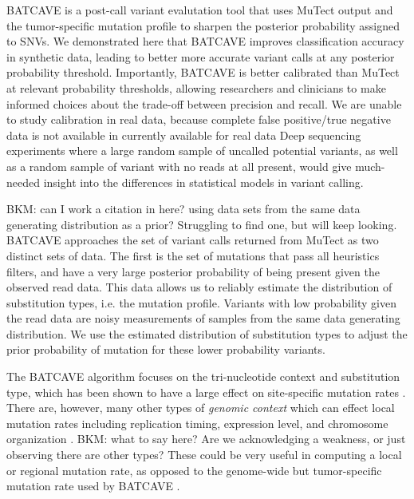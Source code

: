 \documentclass[a4,center,fleqn]{NAR}
\newcommand{\bkmcomment}[1]{{\color{blue}BKM: #1}}
\newcommand{\batcave}{BATCAVE }
\begin{document}
\batcave is a post-call variant evalutation tool that uses MuTect output and the tumor-specific mutation profile to sharpen the posterior probability assigned to SNVs.
We demonstrated here that \batcave improves classification accuracy in synthetic data, leading to better more accurate variant calls at any posterior probability threshold.
Importantly, \batcave is better calibrated than MuTect at relevant probability thresholds, allowing researchers and clinicians to make informed choices about the trade-off between precision and recall.
We are unable to study calibration in real data, because complete false positive/true negative data is not available in currently available for real data
Deep sequencing experiments where a large random sample of uncalled potential variants, as well as a random sample of variant with no reads at all present, would give much-needed insight into the differences in statistical models in variant calling.

\bkmcomment{can I work a citation in here? using data sets from the same data generating distribution as a prior? Struggling to find one, but will keep looking.}
\batcave approaches the set of variant calls returned from MuTect as two distinct sets of data.
The first is the set of mutations that pass all heuristics filters, and  have a very large posterior probability of being present given the observed read data.
This data allows us to reliably estimate the distribution of substitution types, i.e. the mutation profile.
Variants with low probability given the read data are noisy measurements of samples from the same data generating distribution.
We use the estimated distribution of substitution types to adjust the prior probability of mutation for these lower probability variants.

The \batcave algorithm focuses on the tri-nucleotide context and substitution type, which has been shown to have a large effect on site-specific mutation rates \cite{Martincorena2015,Hollstein2017}.
There are, however, many other types of \textit{genomic context} which can effect local mutation rates including replication timing, expression level, and chromosome organization \cite{Buisson2019,Schuster-Bockler2012,Pleasance2010}.
\bkmcomment{what to say here? Are we acknowledging a weakness, or just observing there are other types?}
These could be very useful in computing a local or regional mutation rate, as opposed to the genome-wide but tumor-specific mutation rate used by \batcave.
\end{document}
